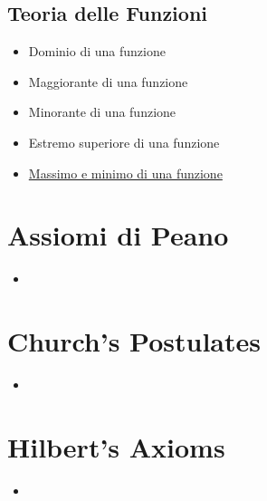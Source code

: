 \subsection*{Teoria delle Funzioni}
\begin{itemize}
 \item Dominio di una funzione
 \item Maggiorante di una funzione
 \item Minorante di una funzione
 \item Estremo superiore di una funzione
 \item \href{FunzioneMassimoMinimo.pdf}{Massimo e minimo di una funzione}
\end{itemize}

\section{Assiomi di Peano}
\begin{itemize}
 \item 
\end{itemize}

\section{Church's Postulates}
\begin{itemize}
 \item 
\end{itemize}

\section{Hilbert's Axioms}
\begin{itemize}
 \item 
\end{itemize}




